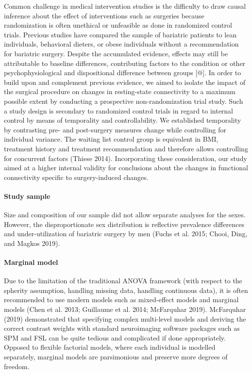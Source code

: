 \documentclass[
]{article}
\begin{document}
Common challenge in medical intervention studies is the difficulty to draw causal inference about the effect of interventions such as surgeries because randomization is often unethical or unfeasible as done in randomized control trials.
Previous studies have compared the sample of bariatric patients to lean individuals, behavioral dieters, or obese individuals without a recommendation for bariatric surgery.
Despite the accumulated evidence, effects may still be attributable to baseline differences, contributing factors to the condition or other psychophysiological and dispositional difference between groups {[}@{]}.
In order to build upon and complement previous evidence, we aimed to isolate the impact of the surgical procedure on changes in resting-state connectivity to a maximum possible extent by conducting a prospective non-randomization trial study.
Such a study design is secondary to randomized control trials in regard to internal control by means of temporality and controllability.
We established temporality by contrasting pre- and post-surgery measures change while controlling for individual variance.
The waiting list control group is equivalent in BMI, treatment history and treatment recommendation and therefore allows controlling for concurrent factors (Thiese 2014).
Incorporating these consideration, our study aimed at a higher internal validity for conclusions about the changes in functional connectivity specific to surgery-induced changes.

\hypertarget{study-sample}{%
\paragraph{Study sample}\label{study-sample}}

Size and composition of our sample did not allow separate analyses for the sexes. However, the disproportionate sex distribution is reflective prevalence differences and under-utilization of bariatric surgery by men (Fuchs et al. 2015; Chooi, Ding, and Magkos 2019).

\hypertarget{marginal-model}{%
\paragraph{Marginal model}\label{marginal-model}}

Due to the limitation of the traditional ANOVA framework (with respect to the spherity assumption, handling missing data, handling continuous data), it is often recommended to use modern models such as mixed-effect models and marginal models (Chen et al. 2013; Guillaume et al. 2014; McFarquhar 2019).
McFarquhar (2019) demonstrated that specifying complex multi-level models and deriving the correct contrast weights with standard neuroimaging software packages such as SPM and FSL can be quite tedious and complicated if done appropriately.
Opposed to flexible factorial models, where each individual is modelled separately, marginal models are parsimonious and preserve more degrees of freedom.
\end{document}
